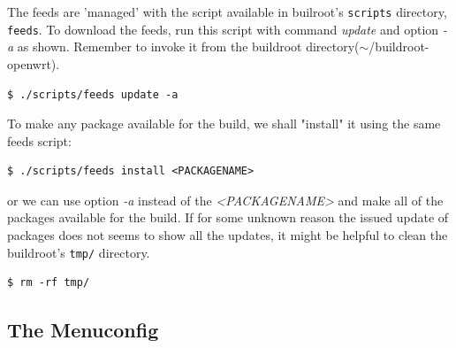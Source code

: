 The feeds are 'managed' with the script available in builroot's {\tt scripts} directory, {\tt feeds}.
To download the feeds, run this script with command {\it update} and option {\it -a} as shown.
Remember to invoke it from the buildroot directory($\sim$/buildroot-openwrt).
\begin{lstlisting}[columns=fixed,basicstyle=\ttfamily\footnotesize,tabsize=4,backgroundcolor=\color{yellow!10}]
$ ./scripts/feeds update -a
\end{lstlisting}
To make any package available for the build, we shall "install" it using the same feeds script:
\begin{lstlisting}[columns=fixed,basicstyle=\ttfamily\footnotesize,tabsize=4,backgroundcolor=\color{yellow!10}]
$ ./scripts/feeds install <PACKAGENAME>
\end{lstlisting}
or we can use option {\it -a} instead of the {\it <PACKAGENAME>} and make all of the packages available for the build.
If for some unknown reason the issued update of packages does not seems to show all the updates, it might be helpful to clean the buildroot's {\tt tmp/} directory\cite{feeds}.
\begin{lstlisting}[columns=fixed,basicstyle=\ttfamily\footnotesize,tabsize=4,backgroundcolor=\color{yellow!10}]
$ rm -rf tmp/
\end{lstlisting}

\subsection{The Menuconfig}

